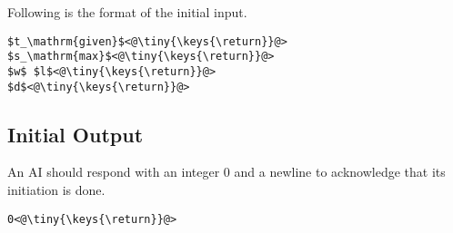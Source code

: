 \documentclass[11pt]{article}
\begin{document}
\makeatletter
\def\lst@visiblespace{$\color{Gray}{}_{
  \mbox{\kern.06em\vrule \@height.3ex}%
  \vbox{\hrule \@width.3em}%
  \hbox{\vrule \@height.3ex}}$}
\makeatother


\noindent
Following is the format of the initial input.

\begin{lstlisting}
$t_\mathrm{given}$<@\tiny{\keys{\return}}@>
$s_\mathrm{max}$<@\tiny{\keys{\return}}@>
$w$ $l$<@\tiny{\keys{\return}}@>
$d$<@\tiny{\keys{\return}}@>
\end{lstlisting}

\subsection{Initial Output}\label{sec:output_init}
An AI should respond with an integer $0$ and a newline to acknowledge that its
initiation is done.

\begin{lstlisting}
0<@\tiny{\keys{\return}}@>
\end{lstlisting}
\end{document}
